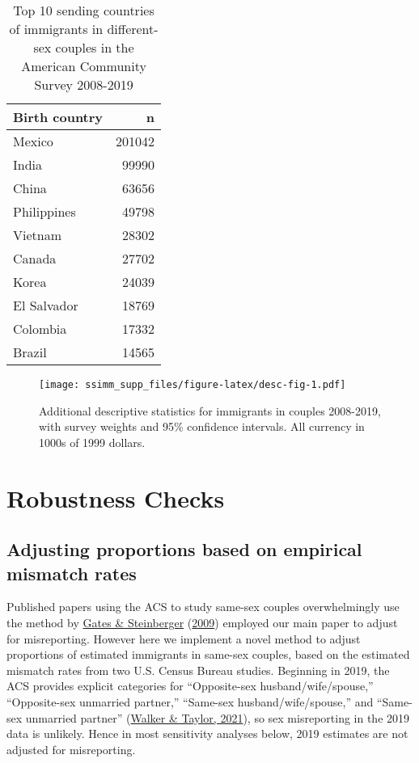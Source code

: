 \documentclass[
  11pt,
]{article}
\begin{document}
\begin{table}

\caption{\label{tab:desc-top2}Top 10 sending countries of immigrants in different-sex couples in the American Community Survey 2008-2019}
\centering
\begin{tabular}[t]{lr}
\toprule
Birth country & n\\
\midrule
Mexico & 201042\\
India & 99990\\
China & 63656\\
Philippines & 49798\\
Vietnam & 28302\\
\addlinespace
Canada & 27702\\
Korea & 24039\\
El Salvador & 18769\\
Colombia & 17332\\
Brazil & 14565\\
\bottomrule
\end{tabular}
\end{table}

\begin{figure}
\centering
\texttt{[image: ssimm\_supp\_files/figure-latex/desc-fig-1.pdf]}
\caption{\label{fig:desc-fig}Additional descriptive statistics for immigrants in couples 2008-2019, with survey weights and 95\% confidence intervals. All currency in 1000s of 1999 dollars.}
\end{figure}

\newpage

\hypertarget{robustness-checks}{%
\section{Robustness Checks}\label{robustness-checks}}

\hypertarget{adjusting-proportions-based-on-empirical-mismatch-rates}{%
\subsection{Adjusting proportions based on empirical mismatch rates}\label{adjusting-proportions-based-on-empirical-mismatch-rates}}

Published papers using the ACS to study same-sex couples overwhelmingly use the method by \protect\hyperlink{ref-gates_2009}{Gates \& Steinberger} (\protect\hyperlink{ref-gates_2009}{2009}) employed our main paper to adjust for misreporting. However here we implement a novel method to adjust proportions of estimated immigrants in same-sex couples, based on the estimated mismatch rates from two U.S. Census Bureau studies. Beginning in 2019, the ACS provides explicit categories for ``Opposite-sex husband/wife/spouse,'' ``Opposite-sex unmarried partner,'' ``Same-sex husband/wife/spouse,'' and ``Same-sex unmarried partner'' (\protect\hyperlink{ref-walker_2021}{Walker \& Taylor, 2021}), so sex misreporting in the 2019 data is unlikely. Hence in most sensitivity analyses below, 2019 estimates are not adjusted for misreporting.
\end{document}
